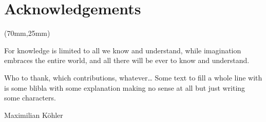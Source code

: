 
\begingroup
{}

\chapter*{Acknowledgements}

\thispagestyle{plain}
\begin{textblock*}{.7\textwidth}(70mm,25mm)
    \begin{fquote}
        For knowledge is limited to all we know and understand, while imagination embraces the entire world, and all there will be ever to know and understand.
    \end{fquote}
\end{textblock*}

Who to thank, which contributions, whatever\dots
Some text to fill a whole line with is some blibla with some explanation making no sense at all but just writing some characters.

\begin{flushright}
    Maximilian Köhler
\end{flushright}

\endgroup